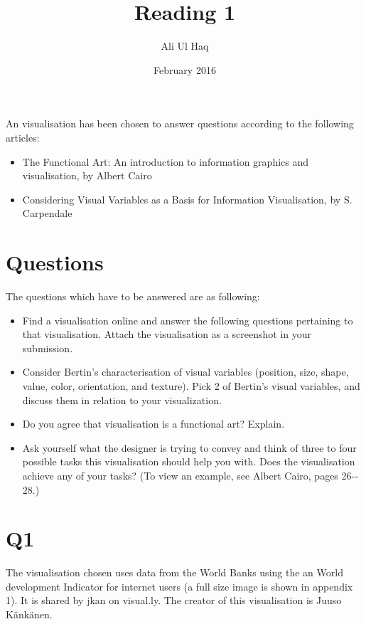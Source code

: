 \documentclass[11pt,a4paper]{article}
\title{Reading 1}
\author{Ali Ul Haq}
\date{February 2016}
\begin{document}
\maketitle

An visualisation has been chosen to answer questions according to the following articles: 
\begin{itemize}[noitemsep]
	\item The Functional Art: An introduction to information graphics and visualisation, by Albert Cairo 
	\item Considering Visual Variables as a Basis for Information Visualisation, by S. Carpendale
\end{itemize}


\section*{Questions}
The questions which have to be answered are as following:
\begin{itemize}[noitemsep]
	\item Find a visualisation online and answer the following questions pertaining to that visualisation. Attach the visualisation as a screenshot in your submission.
	\item Consider Bertin’s characterisation of visual variables (position, size, shape, value, color, orientation, and texture). Pick 2 of Bertin’s visual variables, and discuss them in relation to your visualization.
	\item Do you agree that visualisation is a functional art? Explain.
	\item Ask yourself what the designer is trying to convey and think of three to four possible tasks this visualisation should help you with. Does the visualisation achieve any of your tasks? (To view an example, see Albert Cairo, pages 26-­28.)
\end{itemize}

\section{Q1}
The visualisation chosen uses data from the World Banks using the an World development Indicator for internet users (a full size image is shown in appendix 1). It is shared by jkan on visual.ly. The creator of this visualisation is Juuso K\"{a}nk\"{a}nen.
\end{document}
